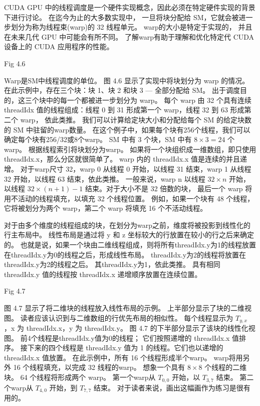 CUDA GPU 中的线程调度是一个硬件实现概念，因此必须在特定硬件实现的背景下进行讨论。 在迄今为止的大多数实现中，
一旦将块分配给 SM，它就会被进一步划分为称为线程束(warp)的 32 线程单元。 warp的大小是特定于实现的，
并且在未来几代 GPU 中可能会有所不同。 了解warp有助于理解和优化特定代 CUDA 设备上的 CUDA 应用程序的性能。

{\color{red} Fig 4.6}

Warp是SM中线程调度的单位。 图 4.6 显示了实现中将块划分为 warp 的情况。 
在此示例中，存在三个块：块 1、块 2 和块 3 — 全部分配给 SM。 出于调度目的，这三个块中的每一个都被进一步划分为 warp。 
每个 warp 由 32 个具有连续 threadIdx 值的线程组成：线程 0 到 31 形成第一个 warp，线程 32 到 63 形成第二个 warp，
依此类推。 我们可以计算给定块大小和分配给每个 SM 的给定块数的 SM 中驻留的warp数量。 
在这个例子中，如果每个块有256个线程，我们可以确定每个块有256/32或8个warp。 
SM 中有 3 个块，SM 中有 $8 \times 3 = 24$ 个warp。 根据线程索引将块划分为warp。 
如果将一个块组织成一维数组，即只使用threadIdx.x，那么分区就很简单了。 warp 内的 threadIdx.x 值是连续的并且递增。 
对于warp尺寸 32，warp 0 从线程 0 开始，以线程 31 结束，warp 1 从线程 32 开始，以线程 63 结束，依此类推。 
一般来说，warp n 以线程 $32 \times n$ 开始，以线程 $32 \times (n+1) - 1$ 结束。对于大小不是 32 倍数的块，
最后一个 warp 将用不活动的线程填充，以填充 32 个线程位置。 
例如，如果一个块有 48 个线程，它将被划分为两个 warp，第二个 warp 将填充 16 个不活动线程。

对于由多个维度的线程组成的块，在划分为warp之前，维度将被投影到线性化的行主布局中。 
线性布局是通过将 y 和 z 坐标较大的行放置在较小的行之后来确定的。 
也就是说，如果一个块由二维线程组成，则将所有threadIdx.y为1的线程放置在threadIdx.y为0的线程之后，形成线性布局。
threadIdx.y为2的线程将放置在threadIdx.y为2的线程之后。 其threadIdx.y为1，依此类推。 
具有相同 threadIdx.y 值的线程按 threadIdx.x 递增顺序放置在连续位置。

{\color{red} Fig 4.7}

图 4.7 显示了将二维块的线程放入线性布局的示例。 上半部分显示了块的二维视图。 
读者应该认识到与二维数组的行优先布局的相似性。 每个线程显示为 $T_{y,x}$ ，x 为 threadIdx.x，y 为 threadIdx.y。 
图 4.7 的下半部分显示了该块的线性化视图。 前4个线程是threadIdx.y值为0的线程； 它们按照递增的 threadIdx.x 值排序。 
接下来的四个线程是 threadIdx.y 值为 1 的线程。它们也以递增的 threadIdx.x 值放置。 
在此示例中，所有 16 个线程形成半个warp。 warp将用另外 16 个线程填充，以完成 32 线程的warp。 
想象一个具有 $8 \times 8$ 个线程的二维块。 64 个线程将形成两个 warp。 
第一个warp从 $T_{0,0}$ 开始，以 $T_{3,7}$ 结束。 
第二个warp从 $T_{4,0}$ 开始，到 $T_{7,7}$ 结束。 对于读者来说，画出这幅画作为练习是很有用的。

